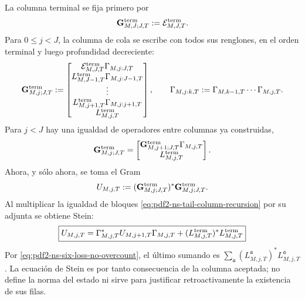 La columna terminal se fija primero por
\begin{equation}\label{eq:pdf2-ns-terminal-tail-column}
 \mathbf G_{M,J;J,T}^{\rm term}:=\mathcal E_{M,J,T}^{\rm term}.
\end{equation}
Para $0\le j<J$, la columna de cola se escribe con todos sus renglones, en el
orden terminal y luego profundidad decreciente:
\begin{equation}\label{eq:pdf2-ns-complete-column}
 \mathbf G_{M,j;J,T}^{\rm term}:=
 \begin{bmatrix}
  \mathcal E_{M,J,T}^{\rm term}\Gamma_{M,j:J,T}\\
  L_{M,J-1,T}^{\rm term}\Gamma_{M,j:J-1,T}\\
  \vdots\\
  L_{M,j+1,T}^{\rm term}\Gamma_{M,j:j+1,T}\\
  L_{M,j,T}^{\rm term}
 \end{bmatrix},
 \qquad
 \Gamma_{M,j:k,T}:=\Gamma_{M,k-1,T}\cdots\Gamma_{M,j,T}.
\end{equation}
Para $j<J$ hay una igualdad de operadores entre columnas ya construidas,
\begin{equation}\label{eq:pdf2-ns-tail-column-recursion}
 \mathbf G_{M,j;J,T}^{\rm term}
 =\begin{bmatrix}
   \mathbf G_{M,j+1;J,T}^{\rm term}\Gamma_{M,j,T}\\
   L_{M,j,T}^{\rm term}
  \end{bmatrix}.
\end{equation}
Ahora, y sólo ahora, se toma el Gram
\begin{equation}\label{eq:pdf2-ns-tail-gram}
 U_{M,j,T}:=
 (\mathbf G_{M,j;J,T}^{\rm term})^*
 \mathbf G_{M,j;J,T}^{\rm term}.
\end{equation}
Al multiplicar la igualdad de bloques
\eqref{eq:pdf2-ns-tail-column-recursion} por su adjunta se obtiene Stein:
\begin{equation}\label{eq:pdf2-ns-local-stein}
 \boxed{\begin{gathered}
 U_{M,j,T}=\Gamma_{M,j,T}^*U_{M,j+1,T}\Gamma_{M,j,T}
 +(L_{M,j,T}^{\rm term})^*L_{M,j,T}^{\rm term}
 \end{gathered}}
\end{equation}
Por \eqref{eq:pdf2-ns-six-loss-no-overcount}, el último sumando es
$\sum_{\mathfrak a}(L_{M,j,T}^{\mathfrak a})^*
L_{M,j,T}^{\mathfrak a}$. La ecuación de Stein es por tanto consecuencia de
la columna aceptada; no define la norma del estado ni sirve para justificar
retroactivamente la existencia de sus filas.

